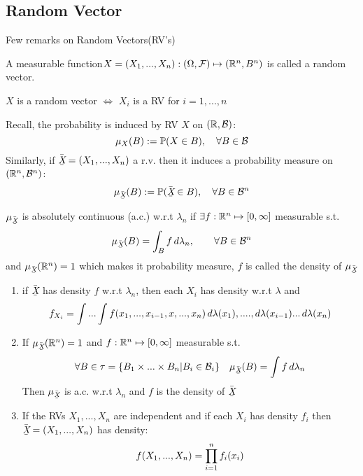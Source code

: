 \subsection{Random Vector}
Few remarks on Random Vectors(RV's)
\begin{dfn}
A measurable function$X=(X_1, ..., X_n): (\Omega, \mathcal{F}) \mapsto (\mathbb{R}^n, B^n)$ is called a random vector.
\end{dfn}
\begin{ex}
$X$ is a random vector $\Longleftrightarrow$ $X_i$ is a RV for $i=1,...,n$
\end{ex}
Recall, the probability is induced by RV $X$ on $(\mathbb{R}, \mathcal{B})$:
\begin{equation*}
    \mu_X(B) := \mathbb{P}(X\in B), \quad \forall B\in\mathcal{B}
\end{equation*}Similarly, if $\doublebar{X} = (X_1,...,X_n)$ a r.v. then it induces a probability measure on $(\mathbb{R}^n, \mathcal{B}^n)$:
\begin{equation*}
    \mu_{\doublebar{X}} (B) := \prob(\doublebar{X}\in B), \quad \forall B\in\B^n
\end{equation*}
\begin{dfn} $\mu_{\doublebar{X}}$ is absolutely continuous (a.c.) w.r.t $\lambda_n$ if $\exists f: \mathbb{R}^n \mapsto [0, \infty]$ measurable s.t. 
\begin{equation*}
    \mu_{\doublebar{X}} (B) = \int_B f \diff\lambda_n, \qquad \forall B\in \B^n
\end{equation*}and $\mu_{\doublebar{X}}(\R^n)=1$ which makes it probability measure,  $f$ is called the density of $\mu_{\doublebar{X}}$
\end{dfn}
\begin{ex}
\begin{enumerate}
    \item if $\doublebar{X}$ has density $f$ w.r.t $\lambda_n$, then each $X_i$ has density w.r.t $\lambda$ and 
    \begin{equation*}
        f_{X_i} = \int ... \int f(x_1, ..., x_{i-1}, x, ...,x_n) \mathop{}\!d \lambda(x_1) ,...., \mathop{}\!d \lambda(x_{i-1}) ...\mathop{}\!d \lambda(x_n)
    \end{equation*}
    \item If $\mu_{\doublebar{X}}(\R^n)=1$ and $f: \mathbb{R}^n \mapsto [0,\infty]$ measurable s.t. 
    \begin{equation*}
        \forall B\in \tau = \{B_1 \times ... \times B_n|B_i\in \B_i\} \quad \mu_{\doublebar{X}}(B) = \int f \diff\lambda_n
    \end{equation*}Then $\mu_{\doublebar{X}}$ is a.c. w.r.t $\lambda_n$ and $f$ is the density of $\doublebar{X}$
    \item If the RVs $X_1,...,X_n$ are independent and if each $X_i$ has density $f_i$ then $\doublebar{X} = (X_1,...,X_n)$ has density:
    \begin{equation*}
        f(X_1,...,X_n) = \prod\limits_{i=1}^n f_i(x_i)
    \end{equation*}
\end{enumerate}
\end{ex}
\newpage
